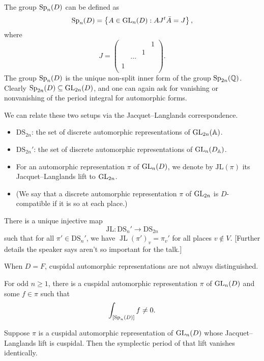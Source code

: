 \documentclass[reqno]{amsart} 
\begin{document}
The group $\operatorname{Sp}_n(D)$ can be defined as
\begin{equation*}
  \operatorname{Sp}_n(D) = \left\{ A \in \operatorname{GL}_n(D) : A J {}^t \bar{A} = J \right\},
\end{equation*}
where
\begin{equation*}
  J =
  \begin{pmatrix}
    &  &  & 1 \\
    &  & 1 &  \\
    & \dotsb &  &  \\
    1 &  &  &  \\
  \end{pmatrix}.
\end{equation*}
The group $\operatorname{Sp}_n(D)$ is the unique non-split inner form of the group $\operatorname{Sp}_{2 n}(\mathbb{Q})$.  Clearly $\operatorname{Sp}_{2 n}(D) \subseteq \operatorname{GL}_{2 n}(D)$, and one can again ask for vanishing or nonvanishing of the period integral for automorphic forms.

We can relate these two setups via the Jacquet--Langlands correspondence.
\begin{itemize}
\item $\mathrm{D S}_{2 n}$: the set of discrete automorphic representations of $\operatorname{GL}_{2 n}(\mathbb{A})$.
\item $\mathrm{D S}_{2 n}'$: the set of discrete automorphic representations of $\operatorname{GL}_{n}(D_{\mathbb{A}})$.
\item For an automorphic representation $\pi$ of $\operatorname{GL}_n(D)$, we denote by $\mathrm{JL}(\pi)$ its Jacquet--Langlands lift to $\operatorname{GL}_{2 n}$.
\item (We say that a discrete automorphic representation $\pi$ of $\operatorname{GL}_{2 n}$ is $D$-compatible if it is so at each place.)
\end{itemize}

\begin{theorem}
  There is a unique injective map
  \begin{equation*}
    \mathrm{J L} : \mathrm{D S}_n ' \rightarrow \mathrm{D S}_{2 n}
  \end{equation*}
  such that for all $\pi ' \in \mathrm{D S}_n '$, we have $\operatorname{JL}(\pi ')_v = \pi_v '$ for all places $v \notin V$.  [Further details the speaker says aren't so important for the talk.]
\end{theorem}

When $D = F$, cuspidal automorphic representations are not always distinguished.

\begin{proposition}
  For odd $n \geq 1$, there is a cuspidal automorphic representation $\pi$ of $\operatorname{GL}_n(D)$ and some $f \in \pi$ such that
  \begin{equation*}
    \int_{[\operatorname{Sp}_n(D)]} f \neq 0.
  \end{equation*}
\end{proposition}
\begin{theorem}
  Suppose $\pi$ is a cuspidal automorphic representation of $\operatorname{GL}_n(D)$ whose Jacquet--Langlands lift is cuspidal.  Then the symplectic period of that lift vanishes identically.
\end{theorem}
\end{document}
